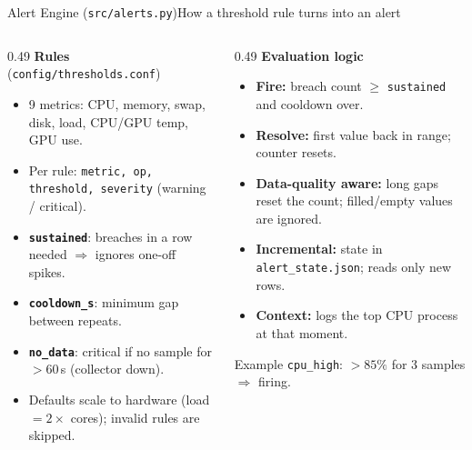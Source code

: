 \documentclass[aspectratio=169,10pt]{beamer}
\begin{document}
\begin{frame}{Alert Engine (\texttt{src/alerts.py})}{How a threshold rule turns into an alert}
\vspace{0.3em}
\footnotesize
\begin{columns}[T]
\begin{column}{0.49\textwidth}
\textbf{Rules} (\texttt{config/thresholds.conf})
\begin{itemize}
  \item 9 metrics: CPU, memory, swap, disk, load, CPU/GPU temp, GPU use.
  \item Per rule: \texttt{metric, op, threshold, severity} (warning / critical).
  \item \textbf{\texttt{sustained}}: breaches in a row needed $\Rightarrow$ ignores one-off spikes.
  \item \textbf{\texttt{cooldown\_s}}: minimum gap between repeats.
  \item \textbf{\texttt{no\_data}}: critical if no sample for $>60$\,s (collector down).
  \item Defaults scale to hardware (load $=2\times$ cores); invalid rules are skipped.
\end{itemize}
\end{column}
\begin{column}{0.49\textwidth}
\textbf{Evaluation logic}
\begin{itemize}
  \item \textbf{Fire:} breach count $\ge$ \texttt{sustained} and cooldown over.
  \item \textbf{Resolve:} first value back in range; counter resets.
  \item \textbf{Data-quality aware:} long gaps reset the count; filled/empty values are ignored.
  \item \textbf{Incremental:} state in \texttt{alert\_state.json}; reads only new rows.
  \item \textbf{Context:} logs the top CPU process at that moment.
\end{itemize}
\begin{block}{Example}
\texttt{cpu\_high}: $>85\%$ for 3 samples $\Rightarrow$ firing.
\end{block}
\end{column}
\end{columns}
\end{frame}
\end{document}
